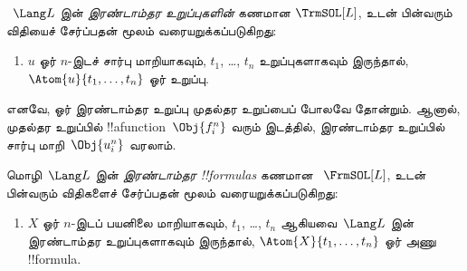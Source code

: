 \documentclass[../../../include/open-logic-section]{subfiles}
\begin{document}
\begin{defn}[இரண்டாம்தர உறுப்புகள்]
~$\Lang L$ இன் \emph{இரண்டாம்தர உறுப்புகளின்} கணமான $\TrmSOL[L]$,
 உடன் பின்வரும் விதியைச் சேர்ப்பதன்
மூலம் வரையறுக்கப்படுகிறது:
\begin{enumerate}
\item $u$ ஓர் $n$-இடச் சார்பு மாறியாகவும், $t_1$, \dots, $t_n$
  உறுப்புகளாகவும் இருந்தால், $\Atom{u}{t_1, \ldots, t_n}$ ஓர் உறுப்பு.
\end{enumerate}
\end{defn}

\begin{explain}
எனவே, ஓர் இரண்டாம்தர உறுப்பு முதல்தர உறுப்பைப் போலவே தோன்றும்.
ஆனால், முதல்தர உறுப்பில் !!a{function}~$\Obj{f^n_i}$ வரும் இடத்தில்,
இரண்டாம்தர உறுப்பில் சார்பு மாறி~$\Obj{u^n_i}$ வரலாம்.
\end{explain}

\begin{defn}
மொழி~$\Lang L$ இன் \emph{இரண்டாம்தர !!{formula}s} கணமான
~$\FrmSOL[L]$,  உடன் பின்வரும்
விதிகளைச் சேர்ப்பதன் மூலம் வரையறுக்கப்படுகிறது:
\begin{enumerate}
\item $X$ ஓர் $n$-இடப் பயனிலை மாறியாகவும், $t_1$, \dots, $t_n$
  ஆகியவை~$\Lang L$ இன் இரண்டாம்தர உறுப்புகளாகவும் இருந்தால்,
  $\Atom{X}{t_1,\ldots, t_n}$ ஓர் அணு !!{formula}.




\end{enumerate}
\end{defn}
\end{document}
